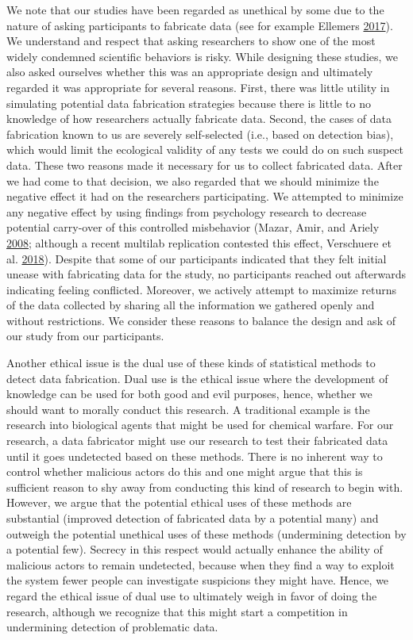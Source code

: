 \documentclass[a5paper]{book}
\begin{document}
We note that our studies have been regarded as unethical by some due to
the nature of asking participants to fabricate data (see for example
Ellemers \protect\hyperlink{ref-ellemers}{2017}). We understand and
respect that asking researchers to show one of the most widely condemned
scientific behaviors is risky. While designing these studies, we also
asked ourselves whether this was an appropriate design and ultimately
regarded it was appropriate for several reasons. First, there was little
utility in simulating potential data fabrication strategies because
there is little to no knowledge of how researchers actually fabricate
data. Second, the cases of data fabrication known to us are severely
self-selected (i.e., based on detection bias), which would limit the
ecological validity of any tests we could do on such suspect data. These
two reasons made it necessary for us to collect fabricated data. After
we had come to that decision, we also regarded that we should minimize
the negative effect it had on the researchers participating. We
attempted to minimize any negative effect by using findings from
psychology research to decrease potential carry-over of this controlled
misbehavior (Mazar, Amir, and Ariely
\protect\hyperlink{ref-doi:10.1509ux2fjmkr.45.6.633}{2008}; although a
recent multilab replication contested this effect, Verschuere et al.
\protect\hyperlink{ref-doi:10.1177ux2f2515245918781032}{2018}). Despite
that some of our participants indicated that they felt initial unease
with fabricating data for the study, no participants reached out
afterwards indicating feeling conflicted. Moreover, we actively attempt
to maximize returns of the data collected by sharing all the information
we gathered openly and without restrictions. We consider these reasons
to balance the design and ask of our study from our participants.

Another ethical issue is the dual use of these kinds of statistical
methods to detect data fabrication. Dual use is the ethical issue where
the development of knowledge can be used for both good and evil
purposes, hence, whether we should want to morally conduct this
research. A traditional example is the research into biological agents
that might be used for chemical warfare. For our research, a data
fabricator might use our research to test their fabricated data until it
goes undetected based on these methods. There is no inherent way to
control whether malicious actors do this and one might argue that this
is sufficient reason to shy away from conducting this kind of research
to begin with. However, we argue that the potential ethical uses of
these methods are substantial (improved detection of fabricated data by
a potential many) and outweigh the potential unethical uses of these
methods (undermining detection by a potential few). Secrecy in this
respect would actually enhance the ability of malicious actors to remain
undetected, because when they find a way to exploit the system fewer
people can investigate suspicions they might have. Hence, we regard the
ethical issue of dual use to ultimately weigh in favor of doing the
research, although we recognize that this might start a competition in
undermining detection of problematic data.
\end{document}

